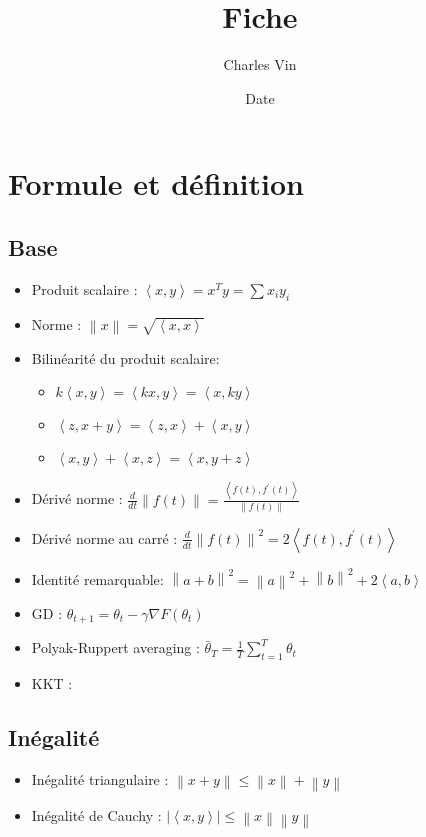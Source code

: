 \documentclass{article}
\title{Fiche}
\author{Charles Vin}
\date{Date}
\theoremstyle{plain}%
\theoremstyle{definition}
\theoremstyle{remark}
\begin{document}
\maketitle

\section{Formule et définition}
\subsection{Base}
\begin{itemize}
    \item Produit scalaire : $ \left\langle x, y \right\rangle = x^T y = \sum x_i y_i $ 
    \item Norme : $ \left\| x \right\| = \sqrt{\left\langle x,x \right\rangle } $ 
    \item Bilinéarité du produit scalaire: \begin{itemize}
        \item $ k \left\langle x, y \right\rangle = \left\langle kx, y \right\rangle = \left\langle x ,ky \right\rangle  $ 
        \item $ \left\langle z, x + y \right\rangle = \left\langle z,x \right\rangle + \left\langle x,y \right\rangle  $ 
        \item $ \left\langle x, y \right\rangle + \left\langle x, z \right\rangle = \left\langle x, y + z \right\rangle  $ 
    \end{itemize}
    \item Dérivé norme : $ \frac{d}{dt} \left\| f(t) \right\| = \frac{\left\langle f(t) , f^\prime (t) \right\rangle }{\left\| f(t) \right\| } $ 
    \item Dérivé norme au carré : $ \frac{d}{dt} \left\| f(t) \right\| ^2 = 2 \left\langle f(t) , f^\prime (t) \right\rangle $
    \item Identité remarquable: $ \left\| a + b \right\|^2 = \left\| a \right\|^2 + \left\| b \right\|^2 + 2 \left\langle a,b \right\rangle  $
    \item GD : $ \theta _{t+1} = \theta _t - \gamma \nabla F(\theta _t) $ 
    \item Polyak-Ruppert averaging : $ \bar{\theta }_T = \frac{1}{T} \sum_{t=1}^{T}\theta _t $ 
    \item KKT : 
\end{itemize}

\subsection{Inégalité}
\begin{itemize}
    \item Inégalité triangulaire : $ \left\| x + y \right\| \leq \left\| x \right\| + \left\| y \right\|  $ 
    \item Inégalité de Cauchy : $ \left| \left\langle x,y \right\rangle  \right| \leq \left\| x \right\| \left\| y \right\| $ 
\end{itemize}
\end{document}
